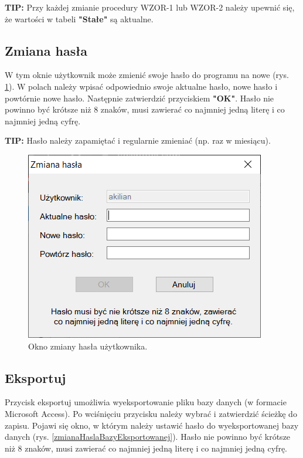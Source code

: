 \textbf{TIP:} Przy każdej zmianie procedury WZOR-1 lub WZOR-2 należy upewnić się, że wartości w tabeli \textbf{"Stałe"} są aktualne.



\subsection{Zmiana hasła}
\label{zmiana_hasla}

W tym oknie użytkownik może zmienić swoje hasło do programu na nowe (rys. \ref{zmianaHasla}). W polach należy wpisać odpowiednio swoje aktualne hasło, nowe hasło i powtórnie nowe hasło. Następnie zatwierdzić przyciskiem \textbf{"OK"}. Hasło nie powinno być krótsze niż 8 znaków, musi zawierać co najmniej jedną literę i co najmniej jedną cyfrę.
	
\textbf{TIP:} Hasło należy zapamiętać i regularnie zmieniać (np. raz w miesiącu).

\begin{figure}[htb]
	\centering
	\includegraphics{obrazki/Ustawienia/zmiana_hasla.png}
	\caption{Okno zmiany hasła użytkownika.}
	\label{zmianaHasla}
\end{figure}

\subsection{Eksportuj}
\label{eksport}

Przycisk eksportuj umożliwia wyeksportowanie pliku bazy danych (w formacie Microsoft Access). Po wciśnięciu przycisku należy wybrać i zatwierdzić ścieżkę do zapisu. Pojawi się okno, w którym należy ustawić hasło do wyeksportowanej bazy danych (rys. \ref{zmianaHaslaBazyEksportowanej}).
Hasło nie powinno być krótsze niż 8 znaków, musi zawierać co najmniej jedną literę i co najmniej jedną cyfrę.

